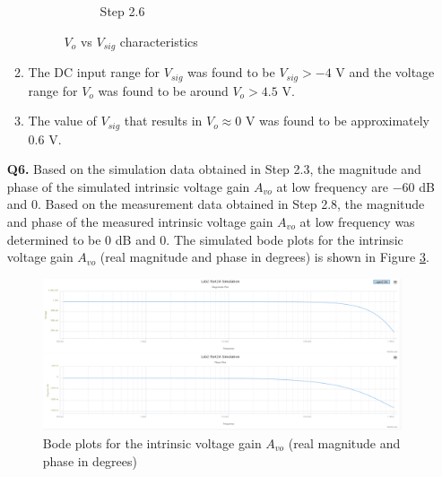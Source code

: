 \documentclass[12pt]{article}
\begin{document}
\begin{itemize}
\begin{enumerate}
\begin{figure}[!ht]
\begin{subfigure}[b]{0.48\textwidth}
                \caption{Step 2.6}
                \label{fig:Step2.6}
            \end{subfigure}
            \caption{$V_o$ vs $V_{sig}$ characteristics}
        \end{figure}
        \item The DC input range for $V_{sig}$ was found to be $V_{sig} > -4$ V and the voltage range for $V_o$ was found to be around $V_o > 4.5$ V.
        \item The value of $V_{sig}$ that results in $V_o \approx 0$ V was found to be approximately 0.6 V.
    \end{enumerate}
    \item [\textbf{Q6.}]
    Based on the simulation data obtained in Step 2.3, the magnitude and phase of the simulated intrinsic voltage gain $A_{vo}$ at low frequency are $-60$ dB and 0\degree. Based on the measurement data obtained in Step 2.8, the magnitude and phase of the measured intrinsic voltage gain $A_{vo}$ at low frequency was determined to be 0 dB and 0\degree. The simulated bode plots for the intrinsic voltage gain $A_{vo}$ (real magnitude and phase in degrees) is shown in Figure \ref{fig:Step2.3}.
    \begin{figure}[!ht]
        \includegraphics[width=\textwidth]{Step2.3}
        \caption{Bode plots for the intrinsic voltage gain $A_{vo}$ (real magnitude and phase in degrees)}
        \label{fig:Step2.3}
    \end{figure}
    \pagebreak

\end{itemize}
\end{document}
